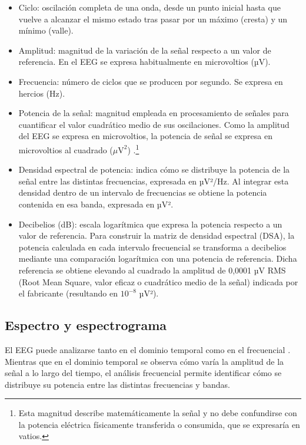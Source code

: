 \documentclass[
  spanish,
  a4paper,
  12pt,
  twoside]{memoir}
\begin{document}
\begin{itemize}
\item
  Ciclo: oscilación completa de una onda, desde un punto inicial hasta
  que vuelve a alcanzar el mismo estado tras pasar por un máximo
  (cresta) y un mínimo (valle).
\item
  Amplitud: magnitud de la variación de la señal respecto a un valor de
  referencia. En el EEG se expresa habitualmente en microvoltios (µV).
\item
  Frecuencia: número de ciclos que se producen por segundo. Se expresa
  en hercios (Hz).
\item
  Potencia de la señal: magnitud empleada en procesamiento de señales
  para cuantificar el valor cuadrático medio de sus oscilaciones. Como
  la amplitud del EEG se expresa en microvoltios, la potencia de señal
  se expresa en microvoltios al cuadrado (\(\mu\mathrm{V}^2\))
  \citep{OppenheimSchafer2014}.\footnote{Esta magnitud describe
    matemáticamente la señal y no debe confundirse con la potencia
    eléctrica físicamente transferida o consumida, que se expresaría en
    vatios.}
\item
  Densidad espectral de potencia: indica cómo se distribuye la potencia
  de la señal entre las distintas frecuencias, expresada en µV²/Hz. Al
  integrar esta densidad dentro de un intervalo de frecuencias se
  obtiene la potencia contenida en esa banda, expresada en µV².
\item
  Decibelios (dB): escala logarítmica que expresa la potencia respecto a
  un valor de referencia. Para construir la matriz de densidad espectral
  (DSA), la potencia calculada en cada intervalo frecuencial se
  transforma a decibelios mediante una comparación logarítmica con una
  potencia de referencia. Dicha referencia se obtiene elevando al
  cuadrado la amplitud de 0,0001 µV RMS (Root Mean Square, valor eficaz
  o cuadrático medio de la señal) \citep{CovidienSerial2010} indicada
  por el fabricante (resultando en \(10^{-8}\) µV²).
\end{itemize}

\subsection{Espectro y espectrograma}\label{espectro-y-espectrograma}

El EEG puede analizarse tanto en el dominio temporal como en el
frecuencial \citep{Kane2017}. Mientras que en el dominio temporal se
observa cómo varía la amplitud de la señal a lo largo del tiempo, el
análisis frecuencial permite identificar cómo se distribuye su potencia
entre las distintas frecuencias y bandas.
\end{document}
